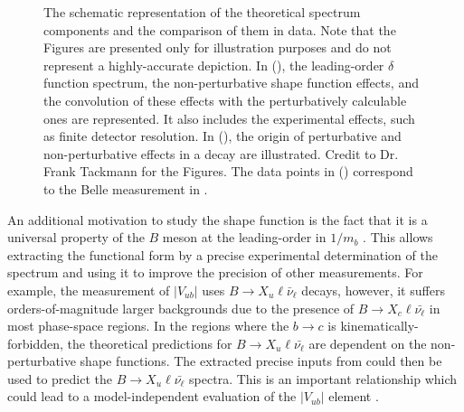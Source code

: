 \begin{figure}[hbtp!]
    \centering
    \caption{\label{fig:xsgamma_theory_sketches} 
    The schematic representation of the theoretical \BtoXsgamma spectrum components and the comparison of them in data.
    Note that the Figures are presented only for illustration purposes and do not represent a highly-accurate depiction.
    In (), the leading-order $\delta$ function spectrum, the non-perturbative shape function effects, and the convolution of these effects with the perturbatively calculable ones are represented.
    It also includes the experimental effects, such as finite detector resolution.
    In (), the origin of perturbative and non-perturbative effects in a \BtoXsgamma decay are illustrated.
    Credit to Dr. Frank Tackmann for the Figures. 
    The data points in () correspond to the Belle measurement in \cite{Belle:2009nth}.}
\end{figure}

An additional motivation to study the shape function is the fact that it is a universal property of the $B$ meson at the leading-order in $1/m_b$ \cite{Neubert:1993um,Bigi:1993ex}.
This allows extracting the functional form by a precise experimental determination of the \BtoXsgamma spectrum and using it to improve the precision of other measurements.
For example, the measurement of $|V_{ub}|$ uses $B\rightarrow X_u \ell \bar{\nu}_{\ell}$ decays, however, it suffers orders-of-magnitude larger backgrounds due to the presence of $B\rightarrow X_c \ell \bar{\nu_{\ell}}$ in most phase-space regions.
In the regions where the $b\to c$ is kinematically-forbidden, the theoretical predictions for $B\rightarrow X_u \ell \bar{\nu_{\ell}}$ are dependent on the non-perturbative shape functions.
The extracted precise inputs from \BtoXsgamma could then be used to predict the $B\rightarrow X_u \ell \bar{\nu_{\ell}}$ spectra.
This is an important relationship which could lead to a model-independent evaluation of the $|V_{ub}|$ element \cite{Neubert:1993um}.

